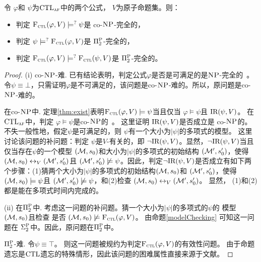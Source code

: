 \begin{theorem}[Entailment]
	\label{thm:comF}
	令 $\varphi$和 $\psi$为$\textrm{CTL}_{\textsc{a} \textsc{f}}$中的两个公式， $V$为原子命题集。则：
	\begin{itemize}
		\item[(i)] 判定  ${\textsc{F}_{\textsc{ctl}}}(\varphi, V ) \models^? \psi$是 co-$\textsc{NP}$-完全的，
		\item[(ii)] 判定  $\psi \models^? {\textsc{F}_{\textsc{ctl}}}(\varphi, V)$是 $\Pi_2^{\textsc{P}}$-完全的，
		\item[(iii)] 判定 ${\textsc{F}_{\textsc{ctl}}}(\varphi, V) \models^? {\textsc{F}_{\textsc{ctl}}}(\psi, V)$是 $\Pi_2^{\textsc{P}}$-完全的。
	\end{itemize}
\end{theorem}
\begin{proof}
	(i) co-$\textsc{NP}$-难. 已有结论表明，判定公式$\varphi$是否是可满足的是$\textsc{NP}$-完全的~\cite{meier2009complexity}。令$\psi \equiv \bot$，只需证明$\varphi$是不可满足的，该问题是co-$\textsc{NP}$-难的。所以，原问题是co-$\textsc{NP}$-难的。
	
	在co-$\textsc{NP}$中. 定理\ref{thm:exist}表明${\textsc{F}_{\textsc{ctl}}}(\varphi, V) \models \psi$当且仅当 $\varphi \models \psi$且 $\textrm{IR}(\psi, V)$。
	在$\textrm{CTL}_{\textsc{a} \textsc{f}}$中，判定 $\varphi \models \psi$是co-$\textsc{NP}$的~\cite{meier2009complexity}。
	这里证明 $\textrm{IR}(\psi, V)$是否成立是 co-$\textsc{NP}$的。不失一般性地，假定$\psi$是可满足的，则 $\psi$有一个大小为$|\psi|$的多项式的模型。
	这里讨论该问题的补问题：判定 $\psi$是$V$-有关的，即 $\neg \textrm{IR}(\psi, V)$。显然，$\neg \textrm{IR}(\psi, V)$当且仅当存在$\psi$的一个模型 $({\cal M},s_0)$和大小为$|\psi|$的多项式的初始结构 $({\cal M}',s_0')$，使得 $({\cal M},s_0) \leftrightarrow_V ({\cal M}',s_0')$且 $({\cal M}',s_0') \not \models \psi$。因此，判定$\neg \textrm{IR}(\psi, V)$是否成立有如下两个步骤：(1)猜两个大小为$|\psi|$的多项式的初始结构$({\cal M},s_0)$和 $({\cal M}',s_0')$，使得 $({\cal M},s_0) \models \psi$且 $({\cal M}',s_0') \not \models \psi$，和(2)检查 $({\cal M},s_0) \leftrightarrow_V ({\cal M}',s_0')$。
	显然， (1)和(2)都是能在多项式时间内完成的。
	
	(ii) 在$\Pi_2^{\textsc{P}}$中. 考虑这一问题的补问题。猜一个大小为$|\psi|$的多项式的$\psi$的 模型 $({\cal M},s_0)$且检查 是否 $({\cal M}, s_0) \not \models {\textsc{F}_{\textsc{ctl}}}(\varphi, V)$。
	由命题\ref{modelChecking} 可知这一问题在 $\Sigma_2^{\textsc{P}}$中。因此，原问题在$\Pi_2^{\textsc{P}}$中。
	
	$\Pi_2^{\textsc{P}}$-难. 令$\psi \equiv \top$。 则这一问题被规约为判定${\textsc{F}_{\textsc{ctl}}}(\varphi, V)$的有效性问题。 
	由于命题遗忘是$\textrm{CTL}$遗忘的特殊情形，因此该问题的困难属性直接来源于文献\cite{DBLP:journals/jair/LangLM03}。
	

\end{proof}
